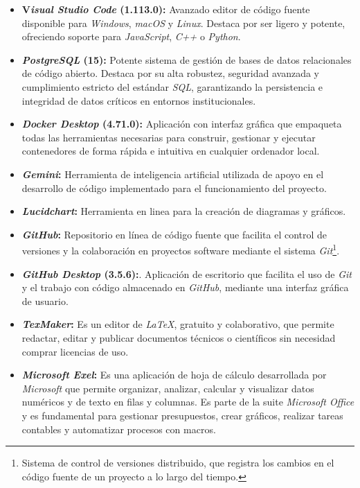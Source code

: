 \begin{itemize}
    \item \textbf{V\textit{isual Studio Code} (1.113.0):} Avanzado editor de código fuente disponible para \textit{Windows}, \textit{macOS} y \textit{Linux}. Destaca por ser ligero y potente, ofreciendo soporte para \textit{JavaScript}, \textit{C++} o \textit{Python}. \cite{vscode}
    
    \item \textbf{\textit{PostgreSQL} (15):} Potente sistema de gestión de bases de datos relacionales de código abierto. Destaca por su alta robustez, seguridad avanzada y cumplimiento estricto del estándar \textit{SQL}, garantizando la persistencia e integridad de datos críticos en entornos institucionales. \cite{postgresql}
    
    \item \textbf{\textit{Docker Desktop} (4.71.0):} Aplicación con interfaz gráfica que empaqueta todas las herramientas necesarias para construir, gestionar y ejecutar contenedores de forma rápida e intuitiva en cualquier ordenador local. \cite{dockerdesktop}
    
    \item \textbf{\textit{Gemini}:} Herramienta de inteligencia artificial utilizada de apoyo en el desarrollo de código implementado para el funcionamiento del proyecto. \cite{gemini} 

    \item \textbf{\textit{Lucidchart}:} Herramienta en linea para la creación de diagramas y gráficos. \cite{lucidchart}

    \item \textbf{\textit{GitHub}:} Repositorio en línea de código fuente que facilita el control de versiones y la colaboración en proyectos software mediante el sistema \textit{Git}\footnote{Sistema de control de versiones distribuido, que registra los cambios en el código fuente de un proyecto a lo largo del tiempo.}. \cite{github}

    \item \textbf{\textit{GitHub Desktop} (3.5.6):}. Aplicación de escritorio que facilita el uso de \textit{Git} y el trabajo con código almacenado en \textit{GitHub}, mediante una interfaz gráfica de usuario. \cite{desktop}

    \item \textbf{\textit{TexMaker}:} Es un editor de \textit{LaTeX}, gratuito y  colaborativo, que permite redactar, editar y publicar documentos técnicos o científicos sin necesidad comprar licencias de uso. \cite{texmaker}

    \item \textbf{\textit{Microsoft Exel}:} Es una aplicación de hoja de cálculo desarrollada por \textit{Microsoft} que permite organizar, analizar, calcular y visualizar datos numéricos y de texto en filas y columnas. Es parte de la suite \textit{Microsoft Office} y es fundamental para gestionar presupuestos, crear gráficos, realizar tareas contables y automatizar procesos con macros. \cite{excel}
\end{itemize}

